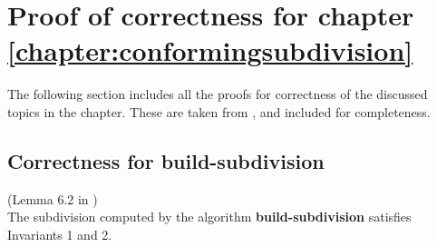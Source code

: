 \chapter{Proof of correctness for chapter \ref{chapter:conformingsubdivision}}\label{appendix:proofs}

The following section includes all the proofs for correctness of the discussed topics in the chapter. These are taken from \cite{HershbergerS99}, and included for completeness.

\section{Correctness for \textbf{build-subdivision}}

\begin{Lemma} (Lemma 6.2 in \cite{HershbergerS99}) \\
The subdivision computed by the algorithm \textbf{build-subdivision} satisfies Invariants 1 and 2.
\end{Lemma}

